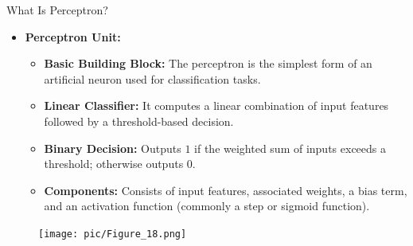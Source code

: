 \documentclass[serif, aspectratio=169]{beamer}
\begin{document}
\begin{frame}{What Is Perceptron?}
    \begin{itemize}
        \item \textbf{Perceptron Unit:}
        \medskip
        \begin{itemize}\itemsep1em
            \item \justifying \textbf{Basic Building Block:}  
            The perceptron is the simplest form of an artificial neuron used for classification tasks.
            
            \item \justifying \textbf{Linear Classifier:}  
            It computes a linear combination of input features followed by a threshold-based decision.
            
            \item \justifying \textbf{Binary Decision:}  
            Outputs \(1\) if the weighted sum of inputs exceeds a threshold; otherwise outputs \(0\).
            
            \item \justifying \textbf{Components:}  
            Consists of input features, associated weights, a bias term, and an activation function (commonly a step or sigmoid function).
        \end{itemize}
    \end{itemize}
    \endminipage
    \hfill
        \begin{figure}
            \centering
            \texttt{[image: pic/Figure\_18.png]}
        \end{figure}
    \endminipage
    \vfill
\end{frame}
\end{document}
